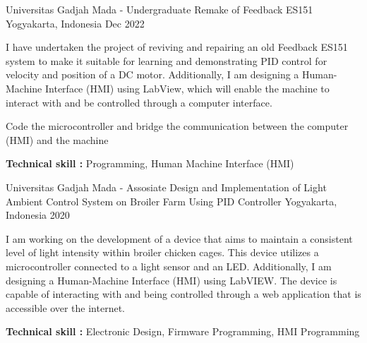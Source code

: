 \begin{cventries}
  \cventry
    {Universitas Gadjah Mada - Undergraduate} %
    {Remake of Feedback ES151} %
    {Yogyakarta, Indonesia} %
    {Dec 2022} %
    {
      \begin{cvitems} %
        \item{I have undertaken the project of reviving and repairing an old Feedback ES151 system to make it suitable for learning and demonstrating PID control for velocity and position of a DC motor. Additionally, I am designing a Human-Machine Interface (HMI) using LabView, which will enable the machine to interact with and be controlled through a computer interface.}
        \item{Code the microcontroller and bridge the communication between the computer (HMI) and the machine}
        \item{\textbf{Technical skill : } Programming, Human Machine Interface (HMI)}
      \end{cvitems}
    }
    
\cventry
{Universitas Gadjah Mada - Assosiate} %
{Design and Implementation of Light Ambient Control System on Broiler Farm Using PID Controller} %
{Yogyakarta, Indonesia} %
{2020} %
{
  \begin{cvitems} %
    \item{I am working on the development of a device that aims to maintain a consistent level of light intensity within broiler chicken cages. This device utilizes a microcontroller connected to a light sensor and an LED. Additionally, I am designing a Human-Machine Interface (HMI) using LabVIEW. The device is capable of interacting with and being controlled through a web application that is accessible over the internet.}
    \item{\textbf{Technical skill : } Electronic Design, Firmware Programming, HMI Programming}
  \end{cvitems}
}


\end{cventries}
